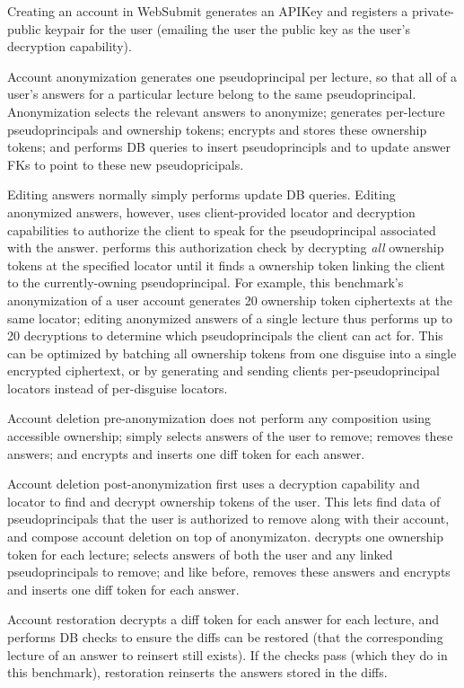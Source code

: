 Creating an account in WebSubmit generates an APIKey and registers a private-public keypair for the
user (emailing the user the public key as the user's decryption capability).

Account anonymization generates one pseudoprincipal per lecture, so that all of a user's answers for
a particular lecture belong to the same pseudoprincipal.  Anonymization selects the relevant answers
to anonymize; generates per-lecture pseudoprincipals and ownership tokens; encrypts and stores these
ownership tokens; and performs DB queries to insert pseudoprincipls and to update answer FKs to
point to these new pseudopricipals.

Editing answers normally simply performs update DB queries. Editing anonymized answers, however,
uses client-provided locator and decryption capabilities to authorize the client to speak for the
pseudoprincipal associated with the answer.  \sys performs this authorization check by decrypting
\emph{all} ownership tokens at the specified locator until it finds a ownership token linking the
client to the currently-owning pseudoprincipal. For example, this benchmark's anonymization of a
user account generates 20 ownership token ciphertexts at the same locator; editing anonymized
answers of a single lecture thus performs up to 20 decryptions to determine which pseudoprincipals
the client can act for. This can be optimized by batching all ownership tokens from one disguise
into a single encrypted ciphertext, or by generating and sending clients per-pseudoprincipal locators
instead of per-disguise locators.

Account deletion pre-anonymization does not perform any composition using accessible ownership; \sys
simply selects answers of the user to remove; removes these answers; and encrypts and inserts one
diff token for each answer.

Account deletion post-anonymization first uses a decryption capability and locator to find and
decrypt ownership tokens of the user. This lets \sys find data of pseudoprincipals that the user is
authorized to remove along with their account, and compose account deletion on top of anonymizaton.
\sys decrypts one ownership token for each lecture; selects answers of both the user and any linked
pseudoprincipals to remove; and like before, removes these answers and encrypts and inserts one diff
token for each answer.

Account restoration decrypts a diff token for each answer for each lecture, and performs DB checks
to ensure the diffs can be restored (\eg that the corresponding lecture of an answer to reinsert
still exists). If the checks pass (which they do in this benchmark), restoration reinserts the
answers stored in the diffs.

